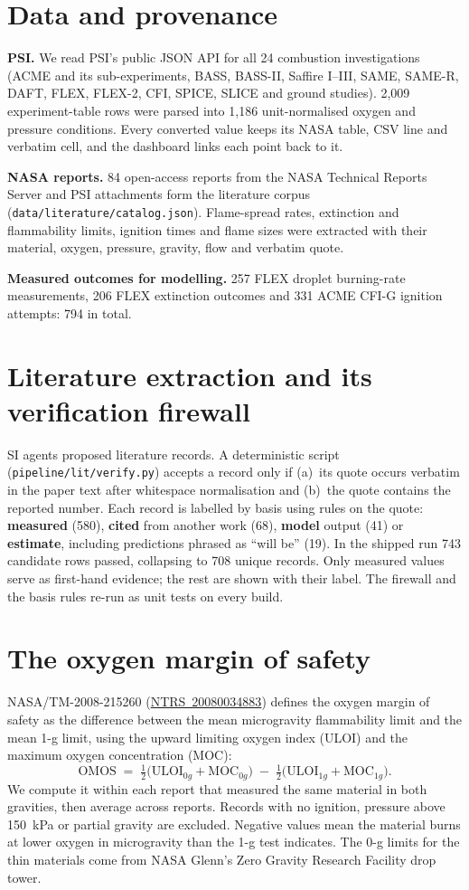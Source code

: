 \documentclass[10pt,letterpaper]{article}
\newcommand{\ntrs}[1]{\href{https://ntrs.nasa.gov/citations/#1}{NTRS~#1}}
\begin{document}
\section{Data and provenance}
\textbf{PSI.} We read PSI's public JSON API for all 24 combustion investigations (ACME and its sub-experiments, BASS, BASS-II, Saffire I--III, SAME, SAME-R, DAFT, FLEX, FLEX-2, CFI, SPICE, SLICE and ground studies). 2{,}009 experiment-table rows were parsed into 1{,}186 unit-normalised oxygen and pressure conditions. Every converted value keeps its NASA table, CSV line and verbatim cell, and the dashboard links each point back to it.

\textbf{NASA reports.} 84 open-access reports from the NASA Technical Reports Server and PSI attachments form the literature corpus (\texttt{data/literature/catalog.json}). Flame-spread rates, extinction and flammability limits, ignition times and flame sizes were extracted with their material, oxygen, pressure, gravity, flow and verbatim quote.

\textbf{Measured outcomes for modelling.} 257 FLEX droplet burning-rate measurements, 206 FLEX extinction outcomes and 331 ACME CFI-G ignition attempts: 794 in total.

\section{Literature extraction and its verification firewall}
SI agents proposed literature records. A deterministic script (\texttt{pipeline/lit/verify.py}) accepts a record only if (a)~its quote occurs verbatim in the paper text after whitespace normalisation and (b)~the quote contains the reported number. Each record is labelled by basis using rules on the quote: \textbf{measured} (580), \textbf{cited} from another work (68), \textbf{model} output (41) or \textbf{estimate}, including predictions phrased as ``will be'' (19). In the shipped run 743 candidate rows passed, collapsing to 708 unique records. Only measured values serve as first-hand evidence; the rest are shown with their label. The firewall and the basis rules re-run as unit tests on every build.

\section{The oxygen margin of safety}
NASA/TM-2008-215260 (\ntrs{20080034883}) defines the oxygen margin of safety as the difference between the mean microgravity flammability limit and the mean 1-g limit, using the upward limiting oxygen index (ULOI) and the maximum oxygen concentration (MOC):
\begin{equation}
\mathrm{OMOS} \;=\; \tfrac12\big(\mathrm{ULOI}_{0g}+\mathrm{MOC}_{0g}\big) \;-\; \tfrac12\big(\mathrm{ULOI}_{1g}+\mathrm{MOC}_{1g}\big).
\label{eq:omos}
\end{equation}
We compute it within each report that measured the same material in both gravities, then average across reports. Records with no ignition, pressure above 150~kPa or partial gravity are excluded. Negative values mean the material burns at lower oxygen in microgravity than the 1-g test indicates. The 0-g limits for the thin materials come from NASA Glenn's Zero Gravity Research Facility drop tower.
\end{document}
